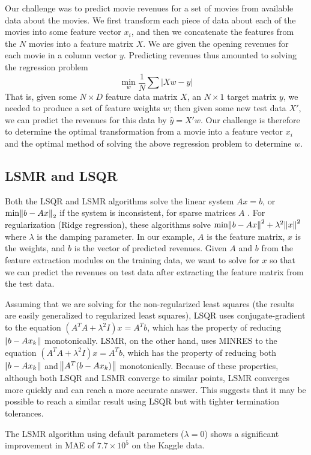 \documentclass[11pt]{amsart}
\begin{document}
Our challenge was to predict movie revenues for a set of movies from available data about the movies. We first transform each piece of data about each of the movies into some feature vector $x_i$, and then we concatenate the features from the $N$ movies into a feature matrix $X$. We are given the opening revenues for each movie in a column vector $y$. Predicting revenues thus amounted to solving the regression problem
$$\min_w \frac{1}{N}\sum |X w - y|$$
That is, given some $N \times D$ feature data matrix $X$, an $N \times 1$ target matrix $y$, we needed to produce a set of feature weights $w$; then given some new test data $X'$, we can predict the revenues for this data by $\hat{y} = X' w$. Our challenge is therefore to determine the optimal transformation from a movie into a feature vector $x_i$ and the optimal method of solving the above regression problem to determine $w$. 

\subsection{LSMR and LSQR}

Both the LSQR and LSMR algorithms solve the linear system $Ax=b$, or $\text{min}\norm{b-Ax}_2$ if the system is inconsistent, for sparse matrices $A$ \cite{LSMR}. For regularization (Ridge regression), these algorithms solve $\text{min}\norm{b-Ax}^2+\lambda^2\norm{x}^2$ where $\lambda$ is the damping parameter. In our example, $A$ is the feature matrix, $x$ is the weights, and $b$ is the vector of predicted revenues. Given $A$ and $b$ from the feature extraction modules on the training data, we want to solve for $x$ so that we can predict the revenues on test data after extracting the feature matrix from the test data.

Assuming that we are solving for the non-regularized least squares (the results are easily generalized to regularized least squares), LSQR uses conjugate-gradient to the equation $(A^TA+\lambda^2I)x=A^Tb$, which has the property of reducing $\norm{b-Ax_k}$ monotonically. LSMR, on the other hand, uses MINRES to the equation $(A^TA+\lambda^2I)x=A^Tb$, which has the property of reducing both $\norm{b-Ax_k}$ and $\norm{A^T(b-Ax_k)}$ monotonically. Because of these properties, although both LSQR and LSMR converge to similar points, LSMR converges more quickly and can reach a more accurate answer. This suggests that it may be possible to reach a similar result using LSQR but with tighter termination tolerances.

The LSMR algorithm using default parameters ($\lambda=0$) shows a significant improvement in MAE of $7.7\times10^5$ on the Kaggle data.
\end{document}
